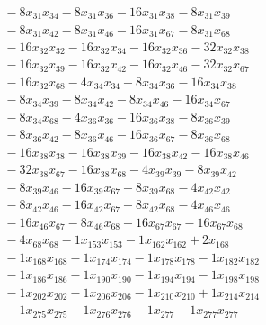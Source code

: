 \[\begin{aligned}
 &\quad - 8 x_{31} x_{34} - 8 x_{31} x_{36} - 16 x_{31} x_{38} - 8 x_{31} x_{39} \\
 &\quad - 8 x_{31} x_{42} - 8 x_{31} x_{46} - 16 x_{31} x_{67} - 8 x_{31} x_{68} \\
 &\quad - 16 x_{32} x_{32} - 16 x_{32} x_{34} - 16 x_{32} x_{36} - 32 x_{32} x_{38} \\
 &\quad - 16 x_{32} x_{39} - 16 x_{32} x_{42} - 16 x_{32} x_{46} - 32 x_{32} x_{67} \\
 &\quad - 16 x_{32} x_{68} - 4 x_{34} x_{34} - 8 x_{34} x_{36} - 16 x_{34} x_{38} \\
 &\quad - 8 x_{34} x_{39} - 8 x_{34} x_{42} - 8 x_{34} x_{46} - 16 x_{34} x_{67} \\
 &\quad - 8 x_{34} x_{68} - 4 x_{36} x_{36} - 16 x_{36} x_{38} - 8 x_{36} x_{39} \\
 &\quad - 8 x_{36} x_{42} - 8 x_{36} x_{46} - 16 x_{36} x_{67} - 8 x_{36} x_{68} \\
 &\quad - 16 x_{38} x_{38} - 16 x_{38} x_{39} - 16 x_{38} x_{42} - 16 x_{38} x_{46} \\
 &\quad - 32 x_{38} x_{67} - 16 x_{38} x_{68} - 4 x_{39} x_{39} - 8 x_{39} x_{42} \\
 &\quad - 8 x_{39} x_{46} - 16 x_{39} x_{67} - 8 x_{39} x_{68} - 4 x_{42} x_{42} \\
 &\quad - 8 x_{42} x_{46} - 16 x_{42} x_{67} - 8 x_{42} x_{68} - 4 x_{46} x_{46} \\
 &\quad - 16 x_{46} x_{67} - 8 x_{46} x_{68} - 16 x_{67} x_{67} - 16 x_{67} x_{68} \\
 &\quad - 4 x_{68} x_{68} - 1 x_{153} x_{153} - 1 x_{162} x_{162} + 2 x_{168} \\
 &\quad - 1 x_{168} x_{168} - 1 x_{174} x_{174} - 1 x_{178} x_{178} - 1 x_{182} x_{182} \\
 &\quad - 1 x_{186} x_{186} - 1 x_{190} x_{190} - 1 x_{194} x_{194} - 1 x_{198} x_{198} \\
 &\quad - 1 x_{202} x_{202} - 1 x_{206} x_{206} - 1 x_{210} x_{210} + 1 x_{214} x_{214} \\
 &\quad - 1 x_{275} x_{275} - 1 x_{276} x_{276} - 1 x_{277} - 1 x_{277} x_{277}
\end{aligned}\]
\endgroup

